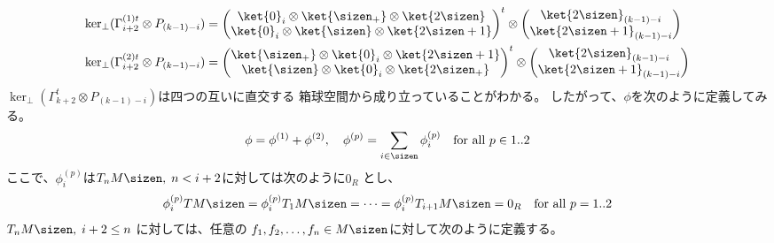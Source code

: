 	\begin{equation*}\begin{split} %
		\ker_\perp(\Gamma_{i+2}^{(1)t}\otimes P_{(k-1)-i})
		&= \begin{pmatrix}
			\ket{0}_{i}\otimes\ket{\sizen_+}\otimes\ket{\myeven} \\
			\ket{0}_{i}\otimes\ket{\sizen}\otimes\ket{\myodd} \\
		\end{pmatrix}^t\otimes \begin{pmatrix}
			\ket{\myeven}_{(k-1)-i} \\
			\ket{\myodd}_{(k-1)-i} \\
		\end{pmatrix} \\
		\ker_\perp(\Gamma_{i+2}^{(2)t}\otimes P_{(k-1)-i})
		&= \begin{pmatrix}
			\ket{\sizen_+}\otimes\ket{0}_{i}\otimes\ket{\myodd} \\
			\ket{\sizen}\otimes\ket{0}_{i}\otimes\ket{\myeven_+} \\
		\end{pmatrix}^t\otimes \begin{pmatrix}
			\ket{\myeven}_{(k-1)-i} \\
			\ket{\myodd}_{(k-1)-i} \\
		\end{pmatrix}
	\end{split}\end{equation*} %
	$\ker_\perp(\Gamma_{k+2}^t\otimes P_{(k-1)-i})$は四つの互いに直交する
	箱球空間から成り立っていることがわかる。
	したがって、$\phi$を次のように定義してみる。
	\begin{equation}\label{eq:phiの定義その一}\begin{split} %
		\phi &= \phi^{(1)}+\phi^{(2)}
		,\quad \phi^{(p)} = \sum_{i\in\sizen}\phi_{i}^{(p)}
		\quad\text{for all }p\in1..2 \\
	\end{split}\end{equation} %
	ここで、$\phi_i^{(p)}$は$T_nM\sizen,\;n<i+2$に対しては次のように$0_R$
	とし、
	\begin{equation*}\begin{split} %
		\phi_i^{(p)}TM\sizen=\phi_i^{(p)}T_1M\sizen=\cdots
		=\phi_i^{(p)}T_{i+1}M\sizen=0_R
		\quad\text{for all }p=1..2
	\end{split}\end{equation*} %
	$T_nM\sizen,\;i+2\le n\;$に対しては、任意の
	$f_1,f_2,\dots,f_n\in M\sizen$に対して次のように定義する。
